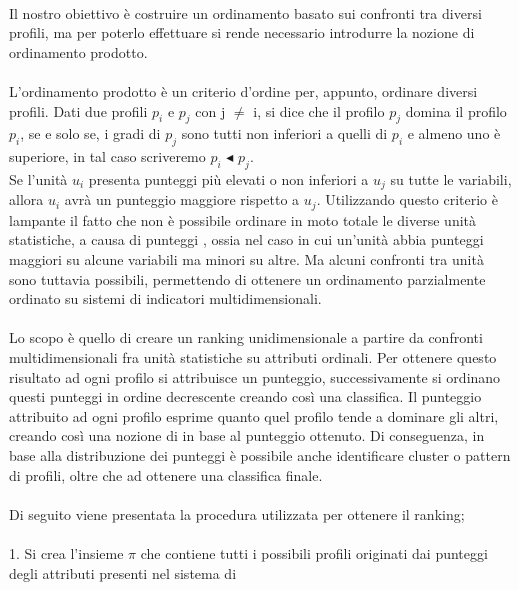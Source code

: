 \documentclass[12pt]{article}
\begin{document}
\\
Il nostro obiettivo è costruire un ordinamento basato sui confronti tra diversi profili, ma per poterlo effettuare si rende necessario introdurre 
la nozione di ordinamento prodotto. \\
\\
L'ordinamento prodotto è un criterio d'ordine per, appunto, ordinare diversi profili. Dati due profili $p_{i}$ e $p_{j}$ con j $\neq$ i, si 
dice che il profilo $p_{j}$ domina il profilo $p_{i}$, se e solo se, i gradi di $p_{j}$ sono tutti non inferiori a quelli di $p_{i}$ e almeno
uno è superiore, in tal caso scriveremo $p_{i}$ $\blacktriangleleft $ $p_{j}$. \\
Se l'unità $u_{i}$ presenta punteggi più elevati o non inferiori a $u_{j}$ su tutte le variabili, allora $u_{i}$ avrà 
un punteggio maggiore rispetto a $u_{j}$. Utilizzando questo criterio è lampante il fatto che non è 
possibile ordinare in moto totale le diverse unità statistiche, a causa di punteggi , ossia
nel caso in cui un'unità abbia punteggi maggiori su alcune variabili ma minori su altre. Ma alcuni 
confronti tra unità sono tuttavia possibili, permettendo di ottenere un ordinamento parzialmente ordinato 
su sistemi di indicatori multidimensionali.\\
\\
Lo scopo è quello di creare un ranking unidimensionale a partire da confronti multidimensionali fra unità
statistiche su attributi ordinali. Per ottenere questo risultato ad ogni profilo si attribuisce un punteggio, successivamente
si ordinano questi punteggi in ordine decrescente creando così una classifica. Il punteggio attribuito ad ogni profilo esprime quanto 
quel profilo tende a dominare gli altri, creando così una nozione di  in base al punteggio ottenuto. Di conseguenza, 
in base alla distribuzione dei punteggi è possibile anche identificare cluster o pattern di profili, oltre che ad ottenere una classifica 
finale. \\
\\
Di seguito viene presentata la procedura utilizzata per ottenere il ranking; \\
\\
1. Si crea l'insieme $\pi$ che contiene tutti i possibili profili originati dai punteggi degli attributi presenti nel sistema di 
\end{document}
